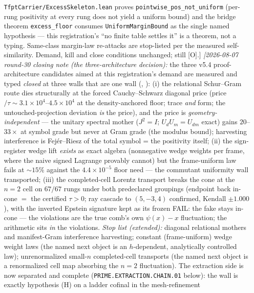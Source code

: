 {\texttt{TfptCarrier/ExcessSkeleton.lean} proves
\texttt{pointwise\_pos\_not\_uniform} (per-rung positivity at
every rung does not yield a uniform bound) and the bridge
theorem \texttt{excess\_floor} consumes
\texttt{UniformMarginBound} as the single named hypothesis ---
this registration's ``no finite table settles it'' is a theorem,
not a typing.  Same-class margin-law re-attacks are stop-listed
per the measured self-similarity.  Demand, kill and close
conditions unchanged; still [O].]
\emph{[2026-08-07 round-30 closing note (the three-architecture
decision):} the three v5.4 proof-architecture candidates aimed at
this registration's demand are measured and typed \emph{closed}
at three walls that are one wall
(,
): (i) the relational
Schur--Gram route dies structurally at the forced Cauchy--Schwarz
diagonal price (price$/\tau \sim 3.1\times10^4$--$4.5\times10^4$
at the density-anchored floor; trace \emph{and} form; the
untouched-projection deviation \emph{is} the price), and the
price is \emph{geometry-independent} --- the unitary spectral
mother ($J^2 = I$; $U_dU_m = U_{dm}$ exact) gains $20$--$33\times$
at symbol grade but never at Gram grade (the modulus bound);
harvesting interference is Fej\'er--Riesz of the total symbol =
the positivity itself; (ii) the sign-register wedge lift
\emph{exists} as exact algebra (nonnegative wedge weights per
frame, where the naive signed Lagrange provably cannot) but the
frame-uniform law fails at ${\sim}15\%$ against the
$4.4\times10^{-5}$ floor need --- the commutant uniformity wall
transported; (iii) the completed-cell Lorentz transport breaks
the cone at the $n = 2$ cell on $67/67$ rungs under both
predeclared groupings (endpoint back in-cone $=$ the certified
$\tau > 0$; ray cascade to $(5,-3,4)$ confirmed, Kendall
$\pm1.000$), with the inverted Epstein signature kept as its
frozen FAIL: the fake stays in-cone --- the violations are the
true comb's own $\psi(x) - x$ fluctuation; the arithmetic sits
\emph{in} the violations.  \emph{Stop list (extended):} diagonal
relational mothers and manifest-Gram interference harvesting;
constant (frame-uniform) wedge weight laws (the named next
object is an $h$-dependent, analytically controlled law);
unrenormalized small-$n$ completed-cell transports (the named
next object is a renormalized cell map absorbing the $n = 2$
fluctuation).  The extraction side is now separated and complete
(\texttt{PRIME.EXTRACTION.CHAIN.01} below): the wall is exactly
hypothesis (H) on a ladder cofinal in the mesh-refinement
}
